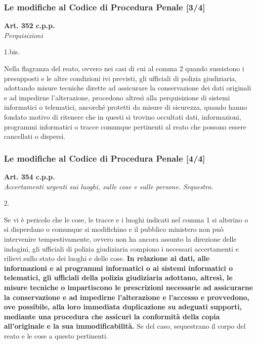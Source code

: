 \documentclass[11pt]{beamer}
\begin{document}
	\begin{frame}[shrink]
		\frametitle{Le modifiche al Codice di Procedura Penale [3/4]}
			\begin{center}
				\textbf{Art. 352 c.p.p.} \\\textit{Perquisizioni}
			\end{center}
			\begin{labeling}{1.bis.}
				\item[\textellipsis]
				\item[1-bis.] Nella flagranza del reato, ovvero nei casi di cui al comma 2 quando sussistono i presupposti e le altre condizioni ivi previsti, gli ufficiali di polizia giudiziaria, adottando misure tecniche dirette ad assicurare la conservazione dei dati originali e ad impedirne l'alterazione, procedono altresì alla perquisizione di sistemi informatici o telematici, ancorché protetti da misure di sicurezza, quando hanno fondato motivo di ritenere che in questi si trovino occultati dati, informazioni, programmi informatici o tracce comunque pertinenti al reato che possono essere cancellati o dispersi.
				\item[\textellipsis]
			\end{labeling}
	\end{frame}
	\begin{frame}[shrink]
		\frametitle{Le modifiche al Codice di Procedura Penale [4/4]}
			\begin{center}
				\textbf{Art. 354 c.p.p.}\\\textit{Accertamenti urgenti sui luoghi, sulle cose e sulle persone. Sequestro.}
			\end{center}
			\begin{labeling}{2.}
				\fontsize{7pt}{\baselineskip}\selectfont
				\setcounter{enumi}{1}
				\item[2.] Se vi è pericolo che le cose, le tracce e i luoghi indicati nel comma 1 si alterino o si disperdano o comunque si modifichino e il pubblico ministero non può intervenire tempestivamente, ovvero non ha ancora assunto la direzione delle indagini, gli ufficiali di polizia giudiziaria compiono i necessari accertamenti e rilievi sullo stato dei luoghi e delle cose. \textbf{In relazione ai dati, alle informazioni e ai programmi informatici o ai sistemi informatici o telematici, gli ufficiali della polizia giudiziaria adottano, altresì, le misure tecniche o impartiscono le prescrizioni necessarie ad assicurarne la conservazione e ad impedirne l'alterazione e l'accesso e provvedono, ove possibile, alla loro immediata duplicazione su adeguati supporti, mediante una procedura che assicuri la conformità della copia all'originale e la sua immodificabilità.} Se del caso, sequestrano il corpo del reato e le cose a questo pertinenti.
			\end{labeling}
	\end{frame}
\end{document}
